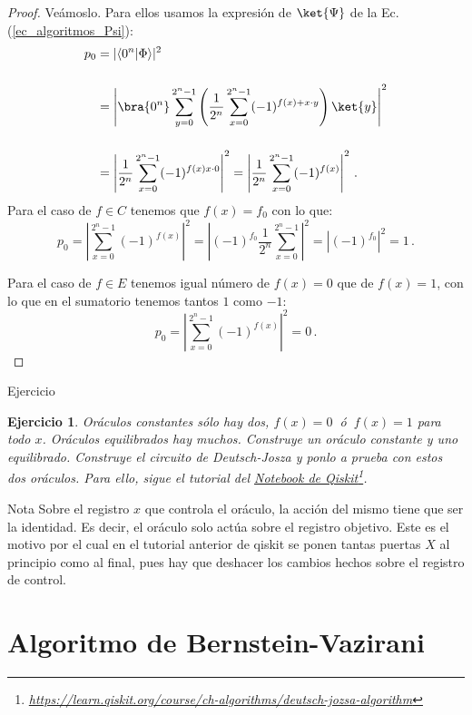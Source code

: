 \documentclass[a4paper,11pt]{book} %
\newtheorem{ejercicio_contador}{Ejercicio}
\newcommand{\Ejercicio}[1]{
		\begin{mybox_gray}{Ejercicio} 
			\begin{ejercicio_contador}
				 #1 
			\end{ejercicio_contador} 
		\end{mybox_gray}
	}
\numberwithin{equation}{chapter}
\newcommand{\braket}[2]{\langle #1|#2\rangle}
\begin{document}
	\begin{proof}
	Veámoslo. Para ellos usamos la expresión de $\ket{\Psi}$ de la Ec. (\ref{ec_algoritmos_Psi}):
	\begin{align*}
	p_{0} &= |\braket{0^n}{\Phi}|^2 \nonumber\\ \rule{0mm}{12mm}
		  &= \left| \bra{0^n} \sum_{y=0}^{2^n-1} \left( \frac{1}{2^n}\sum_{x=0}^{2^n-1}(-1)^{f(x) + x \cdot y} \right)\ket{y} \right|^2 \\ \rule{0mm}{12mm}
	      &= \left| \frac{1}{2^n} \sum_{x=0}^{2^n-1} (-1)^{f(x) x \cdot 0} \right|^2   =  \left| \frac{1}{2^n} \sum_{x=0}^{2^n-1} (-1)^{f(x)} \right|^2 \, .
	\end{align*}
	Para el caso de $f \in C$ tenemos que $f(x) = f_0$ con lo que:
	\begin{equation*}
	p_{0} = \left|  \sum_{x=0}^{2^n-1} (-1)^{f(x)} \right|^2    =  \left| (-1)^{f_0} \frac{1}{2^n} \sum_{x=0}^{2^n-1}  \right|^2  = \left| (-1)^{f_0} \right|^2 = 1  \, .
	\end{equation*}
	
	Para el caso de $f \in E$ tenemos igual número de  $f(x) = 0$ que de $f(x) = 1$, con lo que en el sumatorio tenemos tantos $1$ como $-1$:
	\begin{equation*}
	p_{0} = \left|  \sum_{x=0}^{2^n-1} (-1)^{f(x)} \right|^2    =  0  \, .
	\end{equation*}
	\end{proof}



	\Ejercicio{Oráculos constantes sólo hay dos, $f(x)=0~$ ó $~f(x) = 1$ para todo $x$. Oráculos equilibrados hay muchos. Construye un oráculo constante y uno
	equilibrado. Construye el circuito de Deutsch-Josza y ponlo a prueba con estos dos oráculos. Para ello, sigue el tutorial del 
	\href{https://learn.qiskit.org/course/ch-algorithms/deutsch-jozsa-algorithm}{Notebook de Qiskit}\footnote{\url{https://learn.qiskit.org/course/ch-algorithms/deutsch-jozsa-algorithm}}. }

	\begin{mybox_blue}{Nota}
	Sobre el registro $x$ que controla el oráculo, la acción del mismo tiene que ser la identidad. Es decir, el oráculo solo actúa sobre el registro objetivo. Este es el motivo por el cual en el 
	tutorial anterior de qiskit se ponen tantas puertas $X$ al principio como al final, pues hay que deshacer los cambios hechos sobre el registro de control.
	\end{mybox_blue}

	\section{Algoritmo de Bernstein-Vazirani}
		
\end{document}
